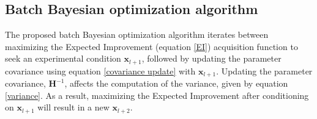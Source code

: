 \documentclass[11pt]{article} %
\begin{document}
\subsection*{Batch Bayesian optimization algorithm}

The proposed batch Bayesian optimization algorithm iterates between maximizing the Expected Improvement (equation \ref{EI}) acquisition function to seek an experimental condition $\mathbf{x}_{l+1}$, followed by updating the parameter covariance using equation \ref{covariance update} with $\mathbf{x}_{l+1}$. Updating the parameter covariance, $\mathbf{H}^{-1}$, affects the computation of the variance, given by equation \ref{variance}. As a result, maximizing the Expected Improvement after conditioning on $\mathbf{x}_{l+1}$ will result in a new $\mathbf{x}_{l+2}$.

\end{document}
